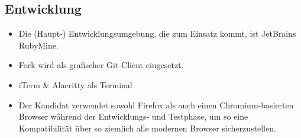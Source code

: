 \subsection{Entwicklung}

\begin{itemize}
    \item Die (Haupt-) Entwicklungsumgebung, die zum Einsatz kommt, ist JetBrains RubyMine.
    \item Fork wird als grafischer Git-Client eingesetzt.
    \item iTerm \& Alacritty als Terminal
    \item Der Kandidat verwendet sowohl Firefox als auch einen Chromium-basierten Browser während der Entwicklungs- und Testphase,
          um so eine Kompatibilität über so ziemlich alle modernen Browser sicherzustellen.
\end{itemize}
